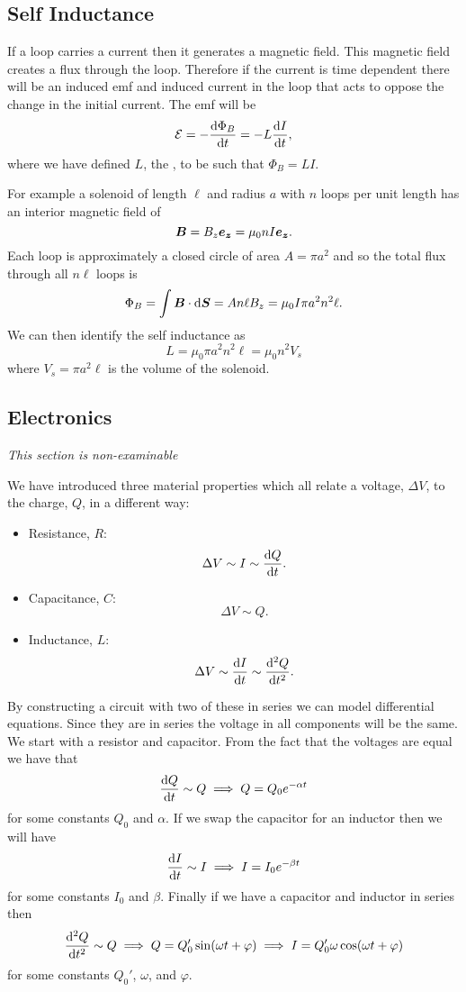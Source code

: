     \subsection{Self Inductance}
    If a loop carries a current then it generates a magnetic field.
    This magnetic field creates a flux through the loop.
    Therefore if the current is time dependent there will be an induced \gls{emf} and induced current in the loop that acts to oppose the change in the initial current.
    The \gls{emf} will be
    \[\mathcal{E} = -\dv{\Phi_B}{t} = -L\dv{I}{t},\]
    where we have defined \(L\), the , to be such that \(\Phi_B = LI\).
    
    For example a solenoid of length \(\ell\) and radius \(a\) with \(n\) loops per unit length has an interior magnetic field of
    \[\bm{B} = B_z\bm{e_{z}} = \mu_0 nI\bm{e_{z}}.\]
    Each loop is approximately a closed circle of area \(A = \pi a^2\) and so the total flux through all \(n\ell\) loops is
    \[\Phi_B = \int \bm{B}\cdot\dd{\bm{S}} = An\ell B_z = \mu_0I\pi a^2n^2\ell.\]
    We can then identify the self inductance as
    \[L = \mu_0 \pi a^2n^2\ell = \mu_0n^2V_s\]
    where \(V_s = \pi a^2\ell\) is the volume of the solenoid.
    
    \subsection{Electronics}
    \textit{This section is non-examinable}
    
    We have introduced three material properties which all relate a voltage, \(\Delta V\), to the charge, \(Q\), in a different way:
    \begin{itemize}
        \item Resistance, \(R\):
        \[\Delta V \sim I \sim \dv{Q}{t}.\]
        \item Capacitance, \(C\):
        \[\Delta V\sim Q.\]
        \item Inductance, \(L\):
        \[\Delta V \sim \dv{I}{t} \sim \dv[2]{Q}{t}.\]
    \end{itemize}
    By constructing a circuit with two of these in series we can model differential equations.
    Since they are in series the voltage in all components will be the same.
    We start with a resistor and capacitor.
    From the fact that the voltages are equal we have that
    \[\dv{Q}{t} \sim Q \implies Q = Q_0e^{-\alpha t}\]
    for some constants \(Q_0\) and \(\alpha\).
    If we swap the capacitor for an inductor then we will have
    \[\dv{I}{t} \sim I \implies I = I_0e^{-\beta t}\]
    for some constants \(I_0\) and \(\beta\).
    Finally if we have a capacitor and inductor in series then
    \[\dv[2]{Q}{t} \sim Q \implies Q = Q_0'\sin(\omega t + \varphi) \implies I = Q_0'\omega\cos(\omega t + \varphi)\]
    for some constants \(Q_0'\), \(\omega\), and \(\varphi\).
    
